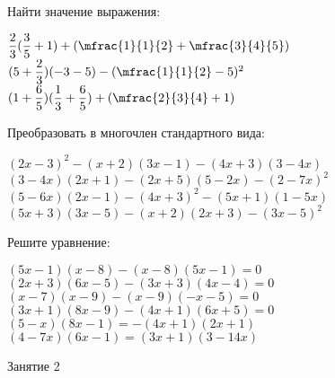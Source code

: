 %
%

\begin{class}[number=1]
	\begin{listofex}
		\item Найти значение выражения:
		\begin{itasks}[1]
			\task \( \dfrac{2}{3}(\dfrac{3}{5}+1)+(\mfrac{1}{1}{2}+\mfrac{3}{4}{5}) \)
			\task \( (5+\dfrac{2}{3})(-3-5)-(\mfrac{1}{1}{2}-5)^2 \)
			\task \( (1+\dfrac{6}{5})(\dfrac{1}{3}+\dfrac{6}{5})+(\mfrac{2}{3}{4}+1) \)
		\end{itasks}
		\item Преобразовать в многочлен стандартного вида:
		\begin{itasks}[1]
			\task \( (2x-3)^2-(x+2)(3x-1)-(4x+3)(3-4x) \)
			\task \( (3-4x)(2x+1)-(2x+5)(5-2x)-(2-7x)^2 \)
			\task \( (5-6x)(2x-1)-(4x+3)^2-(5x+1)(1-5x) \)
			\task \( (5x+3)(3x-5)-(x+2)(2x+3)-(3x-5)^2 \)
		\end{itasks}
		\item Решите уравнение:
		\begin{itasks}[1]
			\task \( (5x-1)(x-8)-(x-8)(5x-1)=0 \)
			\task \( (2x+3)(6x-5)-(3x+3)(4x-4)=0 \)
			\task \( (x-7)(x-9)-(x-9)(-x-5)=0 \)
			\task \( (3x+1)(8x-9)-(4x+1)(6x+5)=0 \)
			\task \( (5-x)(8x-1)=-(4x+1)(2x+1) \)
			\task \( (4-7x)(6x-1)=(3x+1)(3-14x) \)
		\end{itasks}
		
%			
%			
%			
%			
	\end{listofex}
\end{class}

\begin{class}[number=2]
	\begin{listofex}
		\item Занятие 2
	\end{listofex}
\end{class}

